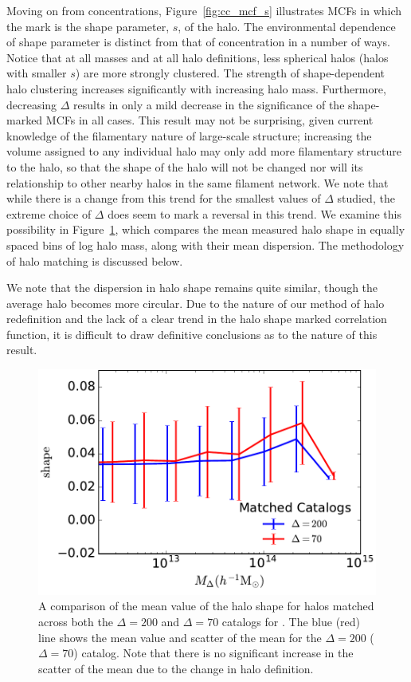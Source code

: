 \documentclass[usenatbib]{mnras}
\begin{document}
Moving on from concentrations, Figure~\ref{fig:cc_mcf_s} illustrates MCFs in which the mark is the shape
parameter, $s$, of the halo. The environmental dependence of shape parameter is distinct from that of
concentration in a number of ways. Notice that at all masses and at all halo definitions, less spherical halos
(halos with smaller $s$) are more strongly clustered. The strength of shape-dependent halo clustering 
increases significantly with increasing halo mass. Furthermore, decreasing $\Delta$ results in only a mild 
decrease in the significance of the shape-marked MCFs in all cases. This result may not be surprising, given 
current knowledge of the filamentary nature of large-scale structure; increasing the volume assigned to 
any individual halo may only add more filamentary structure to the halo, so that the shape of the halo will not be changed 
nor will its relationship to other nearby halos in the same filament network.  
We note that while there is a change from this trend for the smallest values of $\Delta$ studied, the extreme choice of $\Delta$ does
seem to mark a reversal in this trend. We examine this possibility in Figure~\ref{fig:matched_shapecomp},
which compares the mean measured halo shape in equally spaced bins of log halo mass, along with their mean
dispersion. The methodology of halo matching is discussed below.

We note that the dispersion in halo shape remains quite similar, though the average halo becomes more
circular. Due to the nature of our method of halo redefinition and the lack of a clear trend in the halo shape
marked correlation function, it is difficult to draw definitive conclusions as to the nature of this result.


\begin{figure}
	\centering
	\includegraphics[width=.4\textwidth]{matched_catalog_shapecomp.pdf}
	\caption{A comparison of the mean value of the halo shape for halos matched across both
	the $\Delta = 200$ and $\Delta = 70$ catalogs for \simB. The blue (red) line shows the mean value and scatter of
	the	mean for the $\Delta = 200$ ($\Delta = 70$) catalog. Note that there is no significant
	increase in the scatter of the mean due to the change in halo definition.}
	\label{fig:matched_shapecomp}
\end{figure}
\end{document}
